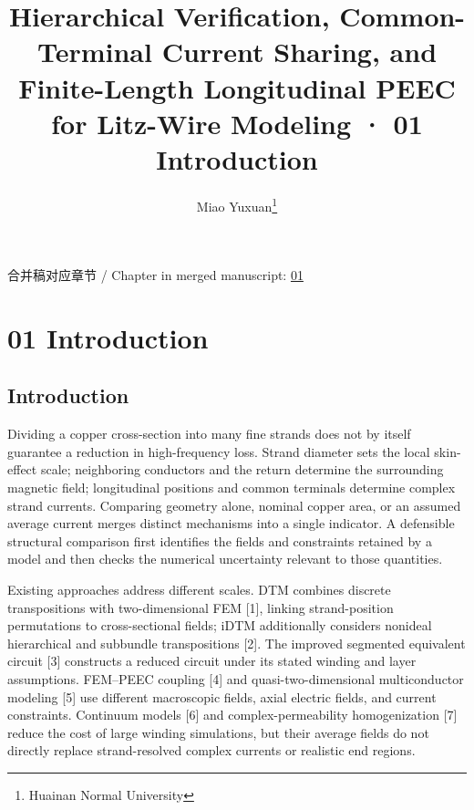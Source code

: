 \documentclass[journal,10pt]{IEEEtran}
\begin{document}
\title{Hierarchical Verification, Common-Terminal Current Sharing, and Finite-Length Longitudinal PEEC for Litz-Wire Modeling · 01 Introduction}
\author{Miao Yuxuan\thanks{Huainan Normal University}}

\maketitle
\noindent 合并稿对应章节 / Chapter in merged manuscript: \href{paper_en_ieee.pdf#chapter-01}{01}\par
\FloatBarrier
\section*{01 Introduction}
\hypertarget{chapter-01}{}
\subsection*{Introduction}
\hypertarget{01.introduction.heading}{}
Dividing a copper cross-section into many fine strands does not by itself guarantee a reduction in high-frequency loss. Strand diameter sets the local skin-effect scale; neighboring conductors and the return determine the surrounding magnetic field; longitudinal positions and common terminals determine complex strand currents. Comparing geometry alone, nominal copper area, or an assumed average current merges distinct mechanisms into a single indicator. A defensible structural comparison first identifies the fields and constraints retained by a model and then checks the numerical uncertainty relevant to those quantities.


Existing approaches address different scales. DTM combines discrete transpositions with two-dimensional FEM [1], linking strand-position permutations to cross-sectional fields; iDTM additionally considers nonideal hierarchical and subbundle transpositions [2]. The improved segmented equivalent circuit [3] constructs a reduced circuit under its stated winding and layer assumptions. FEM–PEEC coupling [4] and quasi-two-dimensional multiconductor modeling [5] use different macroscopic fields, axial electric fields, and current constraints. Continuum models [6] and complex-permeability homogenization [7] reduce the cost of large winding simulations, but their average fields do not directly replace strand-resolved complex currents or realistic end regions.
\end{document}
